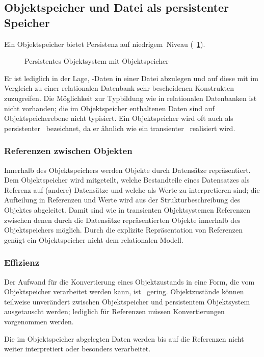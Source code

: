 \subsection{Objektspeicher und Datei als persistenter Speicher}%
\label{sec:objstore}
%
Ein Objektspeicher bietet Persistenz auf \rglq{}niedrigem\rgrq\ Niveau
(\figurename~\ref{fig:llsecst}).
%
\begin{figure}[htbp]%
\ifbuch%
\centerline{}%
\else%
\centerline{}%
\fi%
\caption{Persistentes Objektsystem mit
Objektspeicher}\label{fig:llsecst}%
\end{figure}%
%
Er ist lediglich in der Lage, \cl-Daten in einer Datei abzulegen und
auf diese mit im Vergleich zu einer relationalen Datenbank sehr
bescheidenen Konstrukten zuzugreifen. Die M\"{o}glichkeit zur Typbildung
wie in relationalen Datenbanken ist nicht vorhanden; die im
Objektspeicher enthaltenen Daten sind auf Objektspeicherebene nicht
typisiert. Ein Objektspeicher wird oft auch als persistenter
\heap\ bezeichnet, da er \"{a}hnlich wie ein transienter
\heap\ realisiert wird.
%
\subsubsection{Referenzen zwischen Objekten}%
%
Innerhalb des Objektspeichers werden Objekte durch Datens\"{a}tze
repr\"{a}sentiert. Dem Objektspeicher wird mitgeteilt, welche
Bestandteile eines Datensatzes als Referenz auf (andere) Datens\"{a}tze
und welche als Werte zu interpretieren sind; die Aufteilung in
Referenzen und Werte wird aus der Strukturbeschreibung des Objektes
abgeleitet.  Damit sind wie in transienten Objektsystemen Referenzen
zwischen denen durch die Datens\"{a}tze repr\"{a}sentierten Objekte
innerhalb des Objektspeichers m\"{o}glich. Durch die explizite
Repr\"{a}sentation von Referenzen gen\"{u}gt ein Objektspeicher nicht dem
relationalen Modell.
%
\subsubsection{Effizienz}%
%
Der Aufwand f\"{u}r die Konvertierung eines Objektzustands in eine Form,
die vom Objektspeicher verarbeitet werden kann, ist \ia\ gering.
Objektzust\"{a}nde k\"{o}nnen teilweise unver\"{a}ndert zwischen
Objektspeicher und persistentem Objektsystem ausgetauscht werden;
lediglich f\"{u}r Referenzen m\"{u}ssen Konvertierungen vorgenommen werden.
%
\par{}Die im Objektspeicher abgelegten Daten werden bis auf die
Referenzen nicht weiter interpretiert oder besonders verarbeitet.
%
